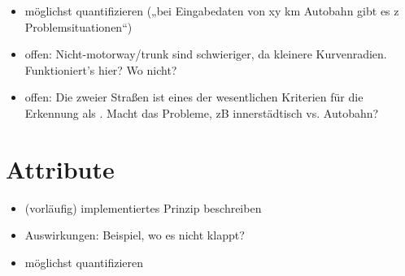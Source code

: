 \documentclass[../main/thesis.tex]{subfiles}
\begin{document}

\begin{itemize}
\item möglichst quantifizieren („bei Eingabedaten von xy km Autobahn gibt es z Problemsituationen“)
\item offen: Nicht-motorway/trunk sind schwieriger, da kleinere Kurvenradien. Funktioniert's hier? Wo nicht?
\item offen: Die  zweier Straßen ist eines der wesentlichen Kriterien für die Erkennung als . Macht das Probleme, zB innerstädtisch vs. Autobahn?
\end{itemize}



\section{Attribute}

\begin{itemize}
\item (vorläufig) implementiertes Prinzip beschreiben
\item Auswirkungen: Beispiel, wo es nicht klappt?
\item möglichst quantifizieren
\end{itemize}
\end{document}
